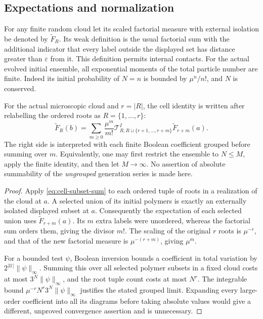 \subsection{Expectations and normalization}

For any finite random cloud let its scaled factorial measure with
external isolation be denoted by $\widetilde F_R$.  Its weak definition
is the usual factorial sum with the additional indicator that every
label outside the displayed set has distance greater than
$\varepsilon$ from it.  This definition permits internal contacts.
For the actual evolved initial ensemble, all exponential moments of
the total particle number are finite.  Indeed its initial probability
of $N=n$ is bounded by $\mu^n/n!$, and $N$ is conserved.

\begin{corollary}
\label{cor:cell-factorial}
For the actual microscopic cloud and $r=|R|$, the cell identity is
written after relabelling the ordered roots as $R=\{1,\ldots,r\}$:
\begin{equation}
 \widetilde F_R(b)
  =\sum_{m\geq0}\frac{\mu^m}{m!}
       \mathcal T^I_{R,R\sqcup\{r+1,\ldots,r+m\}}
       \widetilde F_{r+m}(a).
 \label{eq:cell-factorial}
\end{equation}
The right side is interpreted with each finite Boolean coefficient
grouped before summing over $m$.  Equivalently, one may first restrict
the ensemble to $N\leq M$, apply the finite identity, and then let
$M\to\infty$.  No assertion of absolute summability of the
\emph{ungrouped} generation series is made here.
\end{corollary}

\begin{proof}
Apply \eqref{eq:cell-subset-sum} to each ordered tuple of roots in a
realization of the cloud at $a$.  A selected union of its initial
polymers is exactly an externally isolated displayed subset at $a$.
Consequently the expectation of each selected union uses
$\widetilde F_{r+m}(a)$.  Its $m$ extra labels were unordered, whereas
the factorial sum orders them, giving the divisor $m!$.  The scaling
of the original $r$ roots is $\mu^{-r}$, and that of the new factorial
measure is $\mu^{-(r+m)}$, giving $\mu^m$.

For a bounded test $\psi$, Boolean inversion bounds a coefficient
in total variation by $2^{|\mathcal U|}\|\psi\|_\infty$.  Summing this
over all selected polymer subsets in a fixed cloud costs at most
$3^N\|\psi\|_\infty$, and the root tuple count costs at most $N^r$.
The integrable bound $\mu^{-r}N^r3^N\|\psi\|_\infty$ justifies the
stated grouped limit.  Expanding every large-order coefficient into
all its diagrams before taking absolute values would give a different,
unproved convergence assertion and is unnecessary.
\end{proof}

